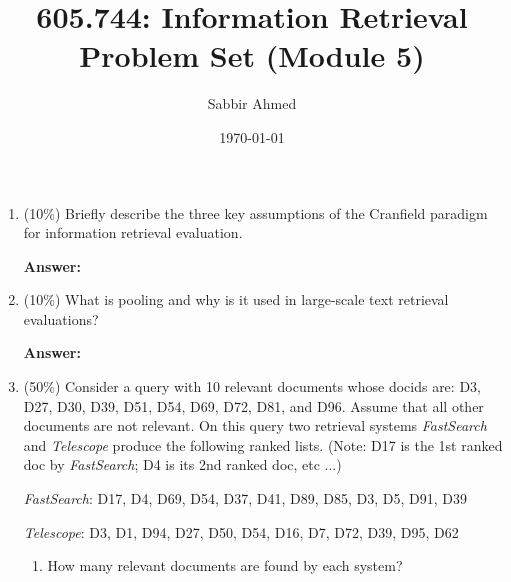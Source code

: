 \documentclass[11pt]{article}
\title{605.744: Information Retrieval \\ Problem Set (Module 5)}
\author{Sabbir Ahmed}
\date{\today}
\begin{document}
\maketitle

    \begin{enumerate}

        \item (10\%) Briefly describe the three key assumptions of the Cranfield paradigm for information retrieval evaluation.

        \textbf{Answer:}

        \item (10\%) What is pooling and why is it used in large-scale text retrieval evaluations?

        \textbf{Answer:}

        \item (50\%) Consider a query with 10 relevant documents whose docids are: D3, D27, D30, D39, D51, D54, D69, D72, D81, and D96. Assume that all other documents are not relevant. On this query two retrieval systems \textit{FastSearch} and \textit{Telescope} produce the following ranked lists. (Note: D17 is the 1st ranked doc by \textit{FastSearch}; D4 is its 2nd ranked doc, etc ...)

        \textit{FastSearch}: D17, D4, D69, D54, D37, D41, D89, D85, D3, D5, D91, D39

        \textit{Telescope}: D3, D1, D94, D27, D50, D54, D16, D7, D72, D39, D95, D62

        \begin{enumerate}

            \item How many relevant documents are found by each system?


\end{enumerate}
\end{enumerate}
\end{document}

